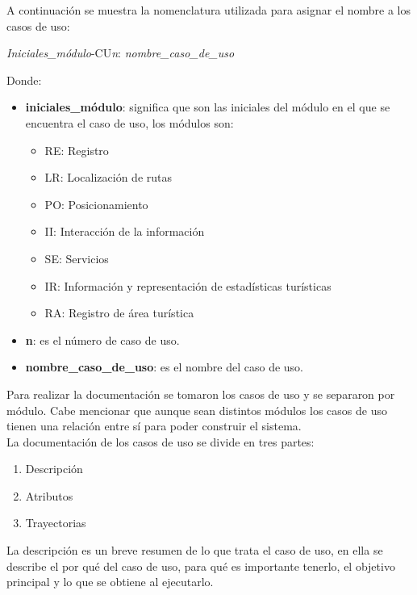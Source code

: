 \newpage
A continuación se muestra la nomenclatura utilizada para asignar el nombre a los casos de uso:

\begin{center}
	\Large{\textit{Iniciales\_módulo}-CU\textit{n}: \textit{nombre\_caso\_de\_uso}}
\end{center}

Donde: 

\begin{itemize}
	\item \textbf{iniciales\_módulo}: significa que son las iniciales del módulo en el que se encuentra el caso de uso, los módulos son: 
	\begin{itemize}
		\item RE: Registro
		\item LR: Localización de rutas
		\item PO: Posicionamiento
		\item II: Interacción de la información
		\item SE: Servicios
		\item IR: Información y representación de estadísticas turísticas
		\item RA: Registro de área turística
	\end{itemize}

	\item \textbf{n}: es el número de caso de uso.
	
	\item \textbf{nombre\_caso\_de\_uso}: es el nombre del caso de uso.
\end{itemize}

Para realizar la documentación se tomaron los casos de uso y se separaron por módulo. Cabe mencionar que aunque sean distintos módulos los casos de uso tienen una relación entre sí para poder construir el sistema. \\

La documentación de los casos de uso se divide en tres partes:

\begin{enumerate}
	\item Descripción
	\item Atributos
	\item Trayectorias
\end{enumerate}

La descripción es un breve resumen de lo que trata el caso de uso, en ella se describe el por qué del caso de uso, para qué es importante tenerlo, el objetivo principal y lo que se obtiene al ejecutarlo.\\

